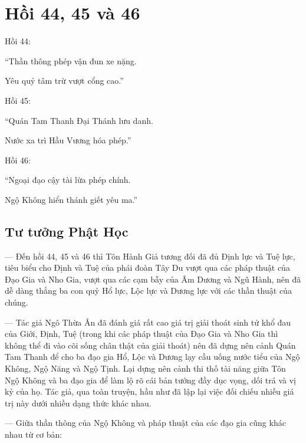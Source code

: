 \chapter{Hồi 44, 45 và 46} %
\label{cha:hoi_44_45}

Hồi 44:

\begin{itshape}
``Thần thông phép vận đun xe nặng.

Yêu quỷ tâm trừ vượt cổng cao.''
\end{itshape}

Hồi 45:

\begin{itshape}
``Quán Tam Thanh Đại Thánh lưu danh.

Nước xa trì Hầu Vương hóa phép.''
\end{itshape}

Hồi 46:

\begin{itshape}
``Ngoại đạo cậy tài lừa phép chính.

Ngộ Không hiển thánh giết yêu ma.''
\end{itshape}

\section{Tư tưởng Phật Học} %
\label{sec:44_45_phat_hoc}

— Đến hồi 44, 45 và 46 thì Tôn Hành Giả tương đối đã đủ Định lực và Tuệ lực, tiêu biểu cho Định và Tuệ của phái đoàn Tây Du vượt qua các pháp thuật của Đạo Gia và Nho Gia, vượt qua các cạm bẫy của Âm Dương và Ngũ Hành, nên đã dễ dàng thắng ba con quỷ Hổ lực, Lộc lực và Dương lực với các thần thuật của chúng.

— Tác giả Ngô Thừa Ân đã đánh giá rất cao giá trị giải thoát sinh tử khổ đau của Giới, Định, Tuệ (trong khi các pháp thuật của Đạo Gia và Nho Gia thì không thể đi vào cõi sống chân thật của giải thoát) nên đã dựng nên cảnh Quán Tam Thanh để cho ba đạo gia Hổ, Lộc và Dương lạy cầu uống nước tiểu của Ngộ Không, Ngộ Năng và Ngộ Tịnh. Lại dựng nên cảnh thi thố tài năng giữa Tôn Ngộ Không và ba đạo gia để làm lộ rõ cái bản tướng đầy dục vọng, dối trá và vị kỷ của họ. Tác giả, qua toàn truyện, hầu như đã lập lại việc đối chiếu nhiều giá trị này dưới nhiều dạng thức khác nhau.

— Giữa thần thông của Ngộ Không và pháp thuật của các đạo gia cũng khác nhau từ cơ bản:

